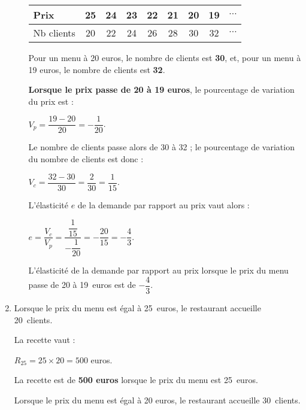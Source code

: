 \begin{corrige}
\begin{enumerate}
\begin{enumerate}[label=\alph*.]
\begin{center}
                    \begin{tabular}{|l|c|c|c|c|c|c|c|c|}%
                         \hline
                         Prix & 25 & 24 & 23 & 22 & 21 & 20 & 19 & $\cdots$ \\
                         \hline
                         Nb clients & 20 & 22 & 24 & 26 & 28 & 30 & 32 & $\cdots$ \\
                         \hline
                    \end{tabular}
               \end{center}
               \par
               Pour un menu à 20 euros, le nombre de clients est \textbf{30}, et, pour un menu à 19 euros, le nombre de clients est \textbf{32}.
               \par
               \textbf{Lorsque le prix passe de 20 à 19 euros}, le pourcentage de variation du prix est :
               \par
               $ V_p=\dfrac{19-20}{20}=-\dfrac{1}{20} $.
               \par
               Le nombre de clients passe alors de 30 à 32 ; le pourcentage de variation du nombre de clients est donc :
               \par
               $V_c=\dfrac{32-30}{30}=\dfrac{2}{30}=\dfrac{1}{15}$.
               \par
               L'élasticité $e$ de la demande par rapport au prix vaut alors :
               \par
               $e=\dfrac{V_c}{V_p}=\dfrac{\dfrac{1}{15}}{-\dfrac{1}{20}}=-\dfrac{20}{15}=-\dfrac{4}{3}$.
               \par
               L'élasticité de la demande par rapport au prix lorsque le prix du menu passe de 20 à 19~euros est de $-\dfrac{4}{3}$.
               \par
          \end{enumerate}
          \item %
          Lorsque le prix du menu est égal à 25~euros, le restaurant accueille {20~clients}.
          \par
          La recette vaut :
          \par
          $R_{25}=25 \times 20 = 500$ euros.
          \par
          La recette est de \textbf{500 euros} lorsque le prix du menu est 25~euros.
          \par
          Lorsque le prix du menu est égal à 20 euros, le restaurant accueille 30~clients.

\end{enumerate}
\end{corrige}
